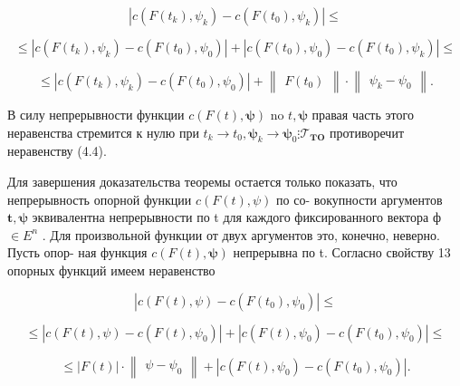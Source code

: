 \documentclass[8pt]{extarticle}
\begin{document}
\[
\left| {c\left( {F\left( {t}_{k}\right) ,{\psi }_{k}}\right)  - c\left( {F\left( {t}_{0}\right) ,{\psi }_{k}}\right) }\right|  \leq
\]

\[
\leq  \left| {c\left( {F\left( {t}_{k}\right) ,{\psi }_{k}}\right)  - c\left( {F\left( {t}_{0}\right) ,{\psi }_{0}}\right) }\right|  + \left| {c\left( {F\left( {t}_{0}\right) ,{\psi }_{0}}\right)  - c\left( {F\left( {t}_{0}\right) ,{\psi }_{k}}\right) }\right|  \leq
\]

\[
\leq  \left| {c\left( {F\left( {t}_{k}\right) ,{\psi }_{k}}\right)  - c\left( {F\left( {t}_{0}\right) ,{\psi }_{0}}\right) }\right|  + \left\lVert \begin{array}{c} {F\left( {t}_{0}\right) } \end{array} \right\rVert \cdot  \left\lVert \begin{array}{c} {{\psi }_{k} - {\psi }_{0}} \end{array} \right\rVert.
\]

В силу непрерывности функции \(c\left( {F\left( t\right) ,\mathbf{\psi }}\right)\) no \(t,\mathbf{\psi }\) правая часть этого неравенства стремится к нулю при \({t}_{k} \rightarrow  {t}_{0},{\mathbf{\psi }}_{k} \rightarrow  {\mathbf{\psi }}_{0}\vdots {\mathcal{T}}_{\mathbf{{TO}}}\) противоречит неравенству (4.4).

Для завершения доказательства теоремы остается только показать, что непрерывность опорной функции \(c\left( {F\left( t\right) ,\psi }\right)\) по со- вокупности аргументов \(\mathbf{t},\mathbf{\psi }\) эквивалентна непрерывности по t для каждого фиксированного вектора ф \(\in  {E}^{n}\) . Для произвольной функции от двух аргументов это, конечно, неверно. Пусть опор- ная функция \(c\left( {F\left( t\right) ,\mathbf{\psi }}\right)\) непрерывна по t. Согласно свойству 13 опорных функций имеем неравенство

\[
\left| {c\left( {F\left( t\right) ,\psi }\right)  - c\left( {F\left( {t}_{0}\right) ,{\psi }_{0}}\right) }\right|  \leq
\]

\[
\leq  \left| {c\left( {F\left( t\right) ,\psi }\right)  - c\left( {F\left( t\right) ,{\psi }_{0}}\right) }\right|  + \left| {c\left( {F\left( t\right) ,{\psi }_{0}}\right)  - c\left( {F\left( {t}_{0}\right) ,{\psi }_{0}}\right) }\right|  \leq
\]

\[
\leq  \left| {F\left( t\right) }\right|  \cdot  \left\lVert \begin{array}{c} {\psi  - {\psi }_{0}} \end{array} \right\rVert + \left| {c\left( {F\left( t\right) ,{\psi }_{0}}\right)  - c\left( {F\left( {t}_{0}\right) ,{\psi }_{0}}\right) }\right| .
\]
\end{document}
